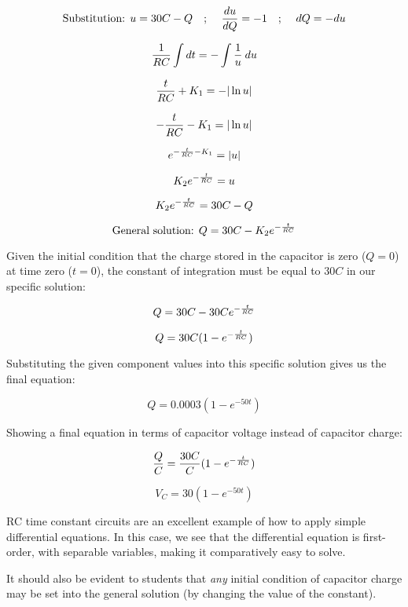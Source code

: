 $$\hbox{Substitution: } u = 30C - Q \hbox{\hskip 10pt ; \hskip 10pt} {du \over dQ} = -1 \hbox{\hskip 10pt ; \hskip 10pt} dQ = -du$$

$${1 \over RC} \int dt = - \int {1 \over u} \> du$$

$${t \over RC} + K_1 = - | \ln u |$$

$$-{t \over RC} - K_1 = | \ln u |$$

$$e^{-{t \over RC} - K_1} = | u |$$

$$K_2e^{-{t \over RC}} = u$$

$$K_2e^{-{t \over RC}} = 30C - Q$$

$$\hbox{General solution: } Q = 30C - K_2e^{-{t \over RC}}$$

Given the initial condition that the charge stored in the capacitor is zero ($Q = 0$) at time zero ($t = 0$), the constant of integration must be equal to $30C$ in our specific solution:

$$Q = 30C - 30Ce^{-{t \over RC}}$$

$$Q = 30C (1 - e^{-{t \over RC}})$$

Substituting the given component values into this specific solution gives us the final equation:

$$Q = 0.0003(1 - e^{-50t})$$

Showing a final equation in terms of capacitor voltage instead of capacitor charge:

$${Q \over C} = {30C \over C}(1 - e^{-{t \over RC}})$$

$$V_C = 30(1 - e^{-50t})$$







RC time constant circuits are an excellent example of how to apply simple differential equations.  In this case, we see that the differential equation is first-order, with separable variables, making it comparatively easy to solve.

It should also be evident to students that {\it any} initial condition of capacitor charge may be set into the general solution (by changing the value of the constant).




